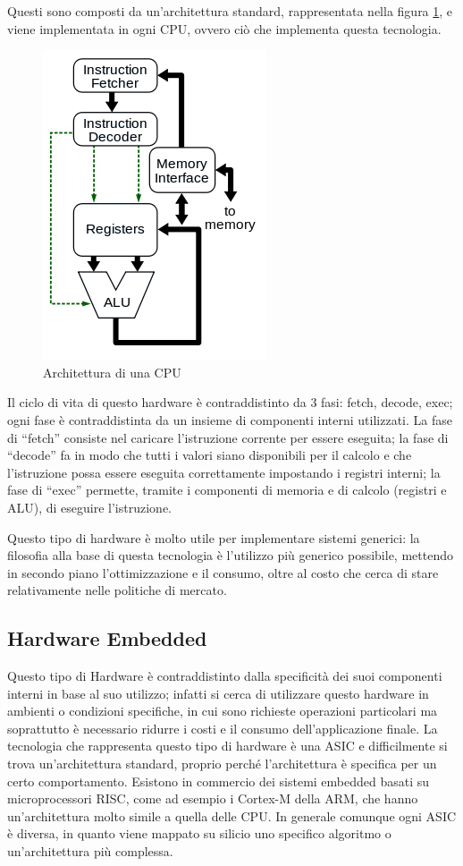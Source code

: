 \documentclass[11pt]{article} %
\begin{document}
Questi sono composti da un'architettura standard,  rappresentata nella figura  \ref{fig:0}, e viene implementata in ogni CPU, ovvero ciò che implementa questa tecnologia.

\begin{figure}
\centering
\includegraphics[scale=1]{cpu.png}
\caption{Architettura di una CPU}\label{fig:0}
\end{figure}

Il ciclo di vita di questo hardware è contraddistinto da 3 fasi: fetch, decode, exec; ogni fase è contraddistinta da un insieme di componenti interni utilizzati. La fase di ``fetch'' consiste nel caricare l'istruzione corrente per essere eseguita; la fase di ``decode'' fa in modo che tutti i valori siano disponibili per il calcolo e che l'istruzione possa essere eseguita correttamente impostando i registri interni; la fase di ``exec'' permette, tramite i componenti di memoria e di calcolo (registri e ALU), di eseguire l'istruzione.

Questo tipo di hardware è molto utile per implementare sistemi generici: la filosofia alla base di questa tecnologia è l'utilizzo più generico possibile, mettendo in secondo piano l'ottimizzazione e il consumo, oltre al costo che cerca di stare relativamente nelle politiche di mercato.

\subsection{Hardware Embedded}
Questo tipo di Hardware è contraddistinto dalla specificità dei suoi componenti interni in base al suo utilizzo; infatti si cerca di utilizzare questo hardware in ambienti o condizioni specifiche, in cui sono richieste operazioni particolari ma soprattutto è necessario ridurre i costi e il consumo dell'applicazione finale.
La tecnologia che rappresenta questo tipo di hardware è una ASIC e difficilmente si trova un'architettura standard, proprio perché l'architettura è specifica per un certo comportamento. Esistono in commercio dei sistemi embedded basati su microprocessori RISC, come ad esempio i Cortex-M della ARM, che hanno un'architettura molto simile a quella delle CPU. In generale comunque ogni ASIC è diversa, in quanto viene mappato su silicio uno specifico algoritmo o un'architettura più complessa.
\end{document}
